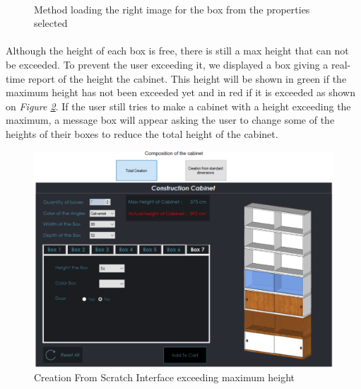 \documentclass[12pt,oneside]{report}
\begin{document}
            \paragraph{}
            \begin{figure}[h!]
                
                \caption{Method loading the right image for the box from the properties selected}
                \label{fig:loadImage}
            \end{figure}
            
            \paragraph{}
            Although the height of each box is free, there is still a max height that can not be exceeded. To prevent the user exceeding it, we displayed a box giving a real-time report of the height the cabinet. This height will be shown in green if the maximum height has not been exceeded yet and in red if it is exceeded as shown on \textit{Figure \ref{fig:maxHeight}}. If the user still tries to make a cabinet with a height exceeding the maximum, a message box will appear asking the user to change some of the heights of their boxes to reduce the total height of the cabinet.
            \vspace{\baselineskip}
            
            \begin{figure}[h!]
                \centering
    			\includegraphics[width = 1\textwidth]{Figures/CreationScratchHeight.PNG}
    			\caption{Creation From Scratch Interface exceeding maximum height}
    			\label{fig:maxHeight}
    		\end{figure}
            \vspace{\baselineskip}
            
\end{document}
